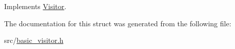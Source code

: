 Implements \hyperlink{struct_visitor_a1481a506dd79cc99d06ea9ebd2ac08ad}{Visitor}.



The documentation for this struct was generated from the following file\+:\begin{DoxyCompactItemize}
\item 
src/\hyperlink{basic__visitor_8h}{basic\+\_\+visitor.\+h}\end{DoxyCompactItemize}
